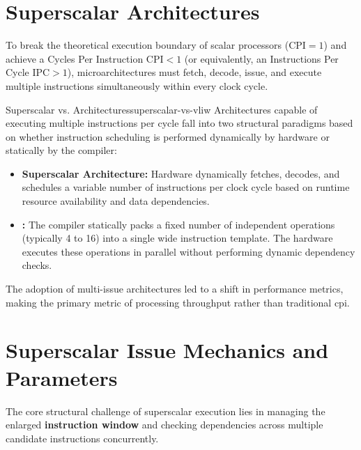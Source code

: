 \section{Superscalar Architectures}
\label{sec:superscalar_architectures}

To break the theoretical execution boundary of scalar processors ($\text{CPI} = 1$) and achieve a Cycles Per Instruction $\text{CPI} < 1$ (or equivalently, an Instructions Per Cycle $\text{IPC} > 1$), microarchitectures must fetch, decode, issue, and execute multiple instructions simultaneously within every clock cycle.

\begin{definition}{Superscalar vs.  Architectures}{superscalar-vs-vliw}
Architectures capable of executing multiple instructions per cycle fall into two structural paradigms based on whether instruction scheduling is performed dynamically by hardware or statically by the compiler:
\begin{itemize}
    \item \textbf{Superscalar Architecture:} Hardware dynamically fetches, decodes, and schedules a variable number of instructions per clock cycle based on runtime resource availability and data dependencies.
    \item \textbf{:} The compiler statically packs a fixed number of independent operations (typically 4 to 16) into a single wide instruction template. The hardware executes these operations in parallel without performing dynamic dependency checks.
\end{itemize}
\end{definition}

The adoption of multi-issue architectures led to a shift in performance metrics, making \textbf{} the primary metric of processing throughput rather than traditional \gls{cpi}.

\section{Superscalar Issue Mechanics and Parameters}
\label{sec:superscalar_issue_mechanics}

The core structural challenge of superscalar execution lies in managing the enlarged \textbf{instruction window} and checking dependencies across multiple candidate instructions concurrently.

